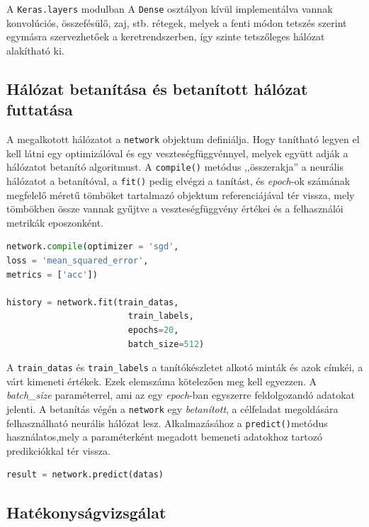 A \verb|Keras.layers| modulban A \verb|Dense| osztályon kívül implementálva vannak konvolúciós, összefésülő, zaj, stb. rétegek, melyek a fenti módon tetszés szerint egymásra szervezhetőek a keretrendszerben, így szinte tetszőleges hálózat alakítható ki.

\subsection{Hálózat betanítása és betanított hálózat futtatása}
\label{subsect:inference}
A megalkotott hálózatot a \verb|network| objektum definiálja. Hogy tanítható legyen el kell látni egy optimizálóval és egy veszteségfüggvénnyel, melyek együtt adják a hálózatot betanító algoritmust. A \verb|compile()| metódus ,,összerakja'' a neurális hálózatot a betanítóval, a \verb|fit()| pedig elvégzi a tanítást, és \emph{epoch}-ok számának megfelelő méretű tömböket tartalmazó objektum referenciájával tér vissza, mely tömbökben össze vannak gyűjtve a veszteségfüggvény értékei és a felhasználói metrikák eposzonként. 
\begin{minipage}{\textwidth}
\begin{lstlisting}[language=Python,caption=Hálózat betanítása]
network.compile(optimizer = 'sgd',
loss = 'mean_squared_error',
metrics = ['acc'])

history = network.fit(train_datas,
						train_labels,
						epochs=20,
						batch_size=512)
\end{lstlisting}\label{lst:fitNetwork}
\end{minipage}

A \verb|train_datas| és \verb|train_labels| a tanítókészletet alkotó minták és azok címkéi, a várt kimeneti értékek. Ezek elemszáma kötelezően meg kell egyezzen. A \emph{batch\_size} paraméterrel, ami az egy \emph{epoch}-ban egyszerre feldolgozandó adatokat jelenti. A betanítás végén a \verb|network| egy \emph{betanított}, a célfeladat megoldására felhasználható neurális hálózat lesz. Alkalmazásához a \verb|predict()|metódus használatos,mely a paraméterként megadott bemeneti adatokhoz tartozó predikciókkal tér vissza.
\begin{minipage}{\textwidth}
\begin{lstlisting}[language=Python, caption=Az eszközre töltött hálózat futtatása az adatokon]
	result = network.predict(datas)
\end{lstlisting}
\end{minipage}

\subsection{Hatékonyságvizsgálat}

